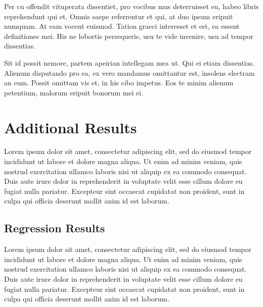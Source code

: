 \documentclass[12pt]{article}
\begin{document}
Per cu offendit vituperata dissentiet, pro vocibus mus deterruisset eu, habeo libris reprehendunt qui et. Omnis saepe referrentur et qui, at duo ipsum eripuit numquam. At eam vocent euismod. Tation graeci interesset et est, ea essent definitiones mei. His ne lobortis persequeris, usu te vide invenire, usu ad tempor dissentias.

Sit id possit nemore, partem apeirian intellegam mea ut. Qui ei etiam dissentias. Alienum disputando pro ea, ex vero mandamus omittantur est, insolens electram an eum. Possit omittam vis et, in his cibo impetus. Eos te minim alienum petentium, malorum eripuit bonorum mei ei.


\newpage



\newpage
\appendix

\section{Additional Results}

Lorem ipsum dolor sit amet, consectetur adipiscing elit, sed do eiusmod tempor incididunt ut labore et dolore magna aliqua. Ut enim ad minim veniam, quis nostrud exercitation ullamco laboris nisi ut aliquip ex ea commodo consequat. Duis aute irure dolor in reprehenderit in voluptate velit esse cillum dolore eu fugiat nulla pariatur. Excepteur sint occaecat cupidatat non proident, sunt in culpa qui officia deserunt mollit anim id est laborum.

\subsection{Regression Results}

Lorem ipsum dolor sit amet, consectetur adipiscing elit, sed do eiusmod tempor incididunt ut labore et dolore magna aliqua. Ut enim ad minim veniam, quis nostrud exercitation ullamco laboris nisi ut aliquip ex ea commodo consequat. Duis aute irure dolor in reprehenderit in voluptate velit esse cillum dolore eu fugiat nulla pariatur. Excepteur sint occaecat cupidatat non proident, sunt in culpa qui officia deserunt mollit anim id est laborum.
\end{document}
